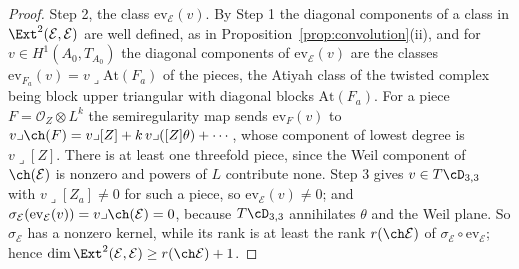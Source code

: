\begin{proof}
Step 2, the class $\mathrm{ev}_{\mathcal{E}}(v)$. By Step 1 the diagonal components of a class in $\Ext^{2}(\mathcal{E},\mathcal{E})$ are well defined, as in Proposition~\ref{prop:convolution}(ii), and for $v\in H^{1}(A_{0},T_{A_{0}})$ the diagonal components of $\mathrm{ev}_{\mathcal{E}}(v)$ are the classes $\mathrm{ev}_{F_{a}}(v)=v\lrcorner\mathrm{At}(F_{a})$ of the pieces, the Atiyah class of the twisted complex being block upper triangular with diagonal blocks $\mathrm{At}(F_{a})$. For a piece $F=\mathcal{O}_{Z}\otimes L^{k}$ the semiregularity map sends $\mathrm{ev}_{F}(v)$ to $v\lrcorner\ch(F)=v\lrcorner[Z]+k\,v\lrcorner([Z]\theta)+\cdots$, whose component of lowest degree is $v\lrcorner[Z]$. There is at least one threefold piece, since the Weil component of $\ch(\mathcal{E})$ is nonzero and powers of $L$ contribute none. Step 3 gives $v\in T\cD_{3,3}$ with $v\lrcorner[Z_{a}]\ne0$ for such a piece, so $\mathrm{ev}_{\mathcal{E}}(v)\ne0$; and $\sigma_{\mathcal{E}}(\mathrm{ev}_{\mathcal{E}}(v))=v\lrcorner\ch(\mathcal{E})=0$, because $T\cD_{3,3}$ annihilates $\theta$ and the Weil plane. So $\sigma_{\mathcal{E}}$ has a nonzero kernel, while its rank is at least the rank $r(\ch\mathcal{E})$ of $\sigma_{\mathcal{E}}\circ\mathrm{ev}_{\mathcal{E}}$; hence $\dim\Ext^{2}(\mathcal{E},\mathcal{E})\ge r(\ch\mathcal{E})+1$.


\end{proof}
